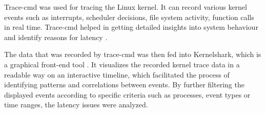\documentclass[MMR,Master,english]{twbook}
\begin{document}

\bigskip \noindent Trace-cmd was used for tracing the Linux kernel. It can record various kernel events such as interrupts, scheduler decisions, file system activity, function calls in real time. Trace-cmd helped in getting detailed insights into system behaviour and identify reasons for latency \cite{Tracecmd}.

\bigskip \noindent The data that was recorded by trace-cmd was then fed into Kernelshark, which is a graphical front-end tool \cite{KernelShark}. It visualizes the recorded kernel trace data in a readable way on an interactive timeline, which facilitated the process of identifying patterns and correlations between events. By further filtering the displayed events according to specific criteria such as processes, event types or time ranges, the latency issues were analyzed.
\end{document}
